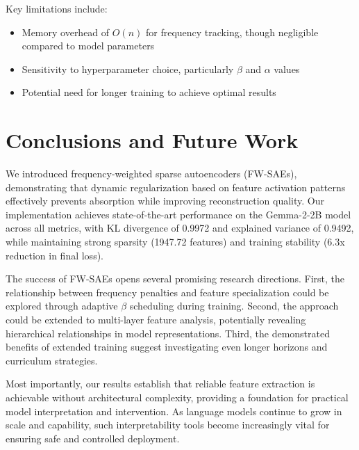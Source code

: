 \documentclass{article} %
\begin{document}
Key limitations include:
\begin{itemize}
\item Memory overhead of $O(n)$ for frequency tracking, though negligible compared to model parameters
\item Sensitivity to hyperparameter choice, particularly $\beta$ and $\alpha$ values
\item Potential need for longer training to achieve optimal results
\end{itemize}

\section{Conclusions and Future Work}
\label{sec:conclusion}

We introduced frequency-weighted sparse autoencoders (FW-SAEs), demonstrating that dynamic regularization based on feature activation patterns effectively prevents absorption while improving reconstruction quality. Our implementation achieves state-of-the-art performance on the Gemma-2-2B model across all metrics, with KL divergence of 0.9972 and explained variance of 0.9492, while maintaining strong sparsity (1947.72 features) and training stability (6.3x reduction in final loss).

The success of FW-SAEs opens several promising research directions. First, the relationship between frequency penalties and feature specialization could be explored through adaptive $\beta$ scheduling during training. Second, the approach could be extended to multi-layer feature analysis, potentially revealing hierarchical relationships in model representations. Third, the demonstrated benefits of extended training suggest investigating even longer horizons and curriculum strategies.

Most importantly, our results establish that reliable feature extraction is achievable without architectural complexity, providing a foundation for practical model interpretation and intervention. As language models continue to grow in scale and capability, such interpretability tools become increasingly vital for ensuring safe and controlled deployment.



\end{document}
